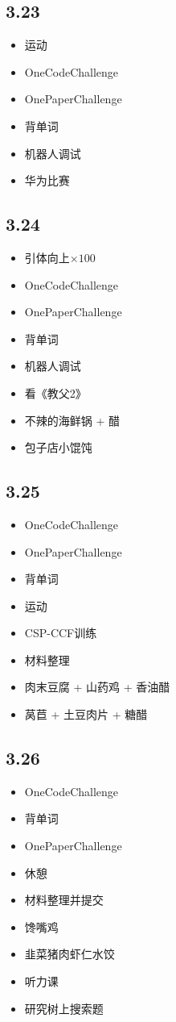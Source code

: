 \documentclass[UTF8]{ctexart}
\begin{document}
\subsection*{3.23}
\begin{itemize}
    \item 运动
    \item OneCodeChallenge
    \item OnePaperChallenge
    \item 背单词
    \item 机器人调试
    \item 华为比赛
\end{itemize}

\subsection*{3.24}
\begin{itemize}
    \item 引体向上$\times 100$
    \item OneCodeChallenge
    \item OnePaperChallenge
    \item 背单词
    \item 机器人调试
    \item 看《教父2》
    \item 不辣的海鲜锅 + 醋
    \item 包子店小馄饨
\end{itemize}

\subsection*{3.25}
\begin{itemize}
    \item OneCodeChallenge
    \item OnePaperChallenge
    \item 背单词
    \item 运动
    \item CSP-CCF训练
    \item 材料整理
    \item 肉末豆腐 + 山药鸡 + 香油醋
    \item 莴苣 + 土豆肉片 + 糖醋
\end{itemize}

\subsection*{3.26}
\begin{itemize}
    \item OneCodeChallenge
    \item 背单词
    \item OnePaperChallenge
    \item 休憩
    \item 材料整理并提交
    \item 馋嘴鸡
    \item 韭菜猪肉虾仁水饺
    \item 听力课
    \item 研究树上搜索题
\end{itemize}
\end{document}
